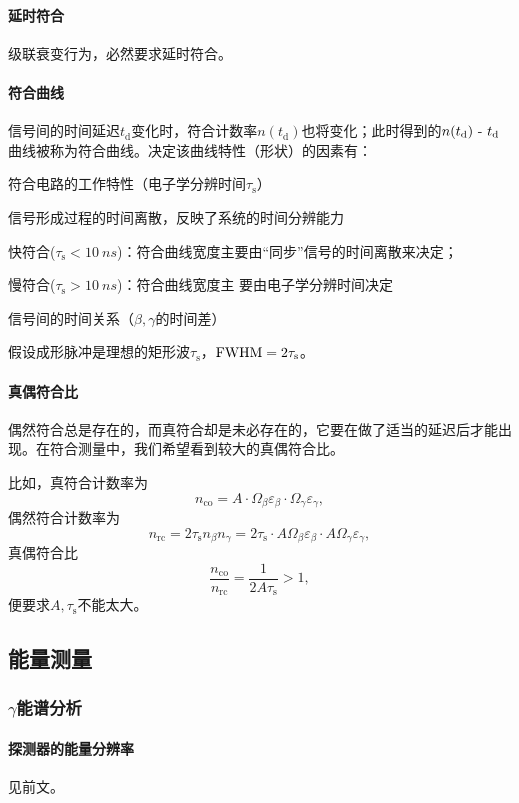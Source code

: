 \paragraph{延时符合}
级联衰变行为，必然要求延时符合。
\paragraph{符合曲线}
信号间的时间延迟$t_\mathrm d$变化时，符合计数率$n(t_\mathrm d)$也将变化；此时得到的$n(t_\mathrm d)~\text{-}~ t_\mathrm d$曲线被称为符合曲线。决定该曲线特性（形状）的因素有：
\begin{compactitem}
	\item 符合电路的工作特性（电子学分辨时间$\tau_\mathrm s$）
	\item 信号形成过程的时间离散，反映了系统的时间分辨能力
	\begin{compactitem}
		\item 快符合($\tau_\mathrm s<\SI{10}{ns}$)：符合曲线宽度主要由“同步”信号的时间离散来决定；
		\item 慢符合($\tau_\mathrm s>\SI{10}{ns}$)：符合曲线宽度主
		要由电子学分辨时间决定
	\end{compactitem}
	\item 信号间的时间关系（$\beta,\gamma$的时间差）
\end{compactitem}
假设成形脉冲是理想的矩形波$\tau_\mathrm s$，$\mathrm{FWHM}=2\tau_\mathrm s$。
\paragraph{真偶符合比}
偶然符合总是存在的，而真符合却是未必存在的，它要在做了适当的延迟后才能出现。在符合测量中，我们希望看到较大的真偶符合比。

比如，真符合计数率为
\[
	n_{\mathrm{co}}=A\cdot\Omega_\beta\varepsilon_\beta\cdot\Omega_\gamma\varepsilon_\gamma,
\]
偶然符合计数率为
\[
	n_{\mathrm{rc}}=2\tau_\mathrm s n_\beta n_\gamma=2\tau_\mathrm s\cdot A\Omega_\beta\varepsilon_\beta\cdot A\Omega_\gamma\varepsilon_\gamma,
\]
真偶符合比
\[
	\frac{n_{\mathrm{co}}}{n_{\mathrm{rc}}}=\frac1{2A\tau_\mathrm s}>1,
\]
便要求$A,\tau_\mathrm s$不能太大。
\subsection{能量测量}
\subsubsection[\textit{\textgamma}能谱分析]{$\gamma$能谱分析}
\paragraph{探测器的能量分辨率}见前文。
